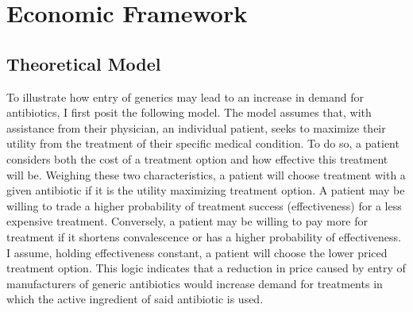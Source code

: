 \chapter{Economic Framework}
\section{Theoretical Model}
To illustrate how entry of generics may lead to an increase in demand for antibiotics, I first posit the following model. The model assumes that, with assistance from their physician, an individual patient, seeks to maximize their utility from the treatment of their specific medical condition. To do so, a patient considers both the cost of a treatment option and how effective this treatment will be. Weighing these two characteristics, a patient will choose treatment with a given antibiotic if it is the utility maximizing treatment option. A patient may be willing to trade a higher probability of treatment success (effectiveness) for a less expensive treatment. Conversely, a patient may be willing to pay more for treatment if it shortens convalescence or has a higher probability of effectiveness. I assume, holding effectiveness constant, a patient will choose the lower priced treatment option. This logic indicates that a reduction in price caused by entry of manufacturers of generic antibiotics would increase demand for treatments in which the active ingredient of said antibiotic is used.

